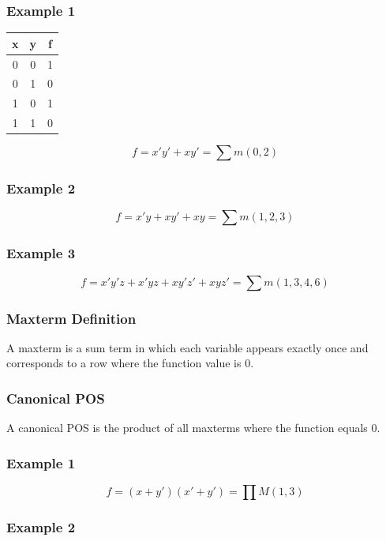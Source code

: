 \subsubsection*{Example 1}

\begin{center}
\begin{tabular}{|c|c|c|}
\hline
x & y & f \\
\hline
0 & 0 & 1 \\
0 & 1 & 0 \\
1 & 0 & 1 \\
1 & 1 & 0 \\
\hline
\end{tabular}
\end{center}

\[
f = x'y' + xy' = \sum m(0,2)
\]

\subsubsection*{Example 2}

\[
f = x'y + xy' + xy = \sum m(1,2,3)
\]

\subsubsection*{Example 3}

\[
f = x'y'z + x'yz + xy'z' + xyz' = \sum m(1,3,4,6)
\]

\subsubsection*{Maxterm Definition}
A maxterm is a sum term in which each variable appears exactly once and corresponds to a row where the function value is 0.

\subsubsection*{Canonical POS}
A canonical POS is the product of all maxterms where the function equals 0.

\subsubsection*{Example 1}

\[
f = (x + y')(x' + y') = \prod M(1,3)
\]

\subsubsection*{Example 2}

